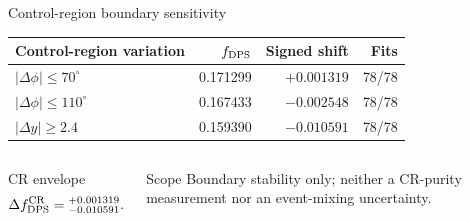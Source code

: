 \documentclass[11pt,aspectratio=169]{beamer}
\begin{document}
\begin{frame}[label=p18]{Control-region boundary sensitivity}
\vspace{4pt}
\begin{center}
\begin{tabular}{lrrr}
\toprule
Control-region variation & $f_{\rm DPS}$ & Signed shift & Fits \\
\midrule
$|\Delta\phi|\leq70^\circ$ & 0.171299 & $+0.001319$ & 78/78 \\
$|\Delta\phi|\leq110^\circ$ & 0.167433 & $-0.002548$ & 78/78 \\
$|\Delta y|\geq2.4$ & 0.159390 & $-0.010591$ & 78/78 \\
\bottomrule
\end{tabular}
\end{center}
\begin{columns}[T]
\begin{exampleblock}{CR envelope}
\[
\Delta f_{\rm DPS}^{\rm CR}={}^{+0.001319}_{-0.010591}.
\]
\end{exampleblock}
\begin{alertblock}{Scope}
Boundary stability only; neither a CR-purity measurement nor an event-mixing uncertainty.
\end{alertblock}
\end{columns}
\end{frame}
\end{document}
